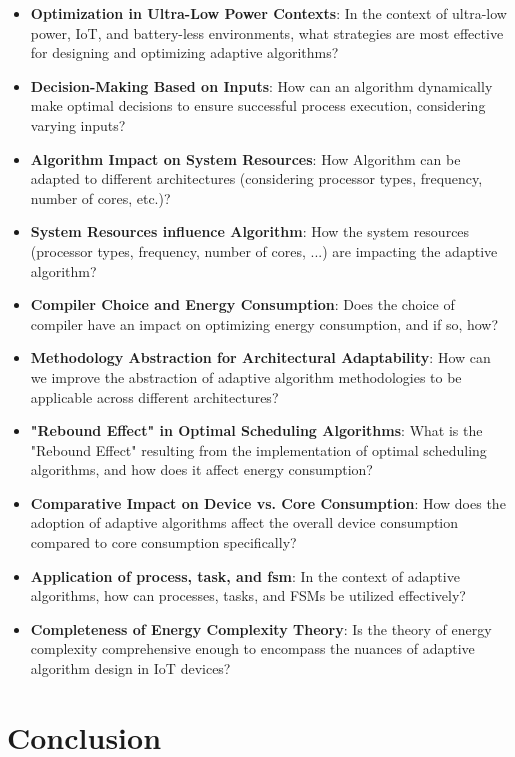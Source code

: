 \documentclass[12pt,a4paper]{article}
\begin{document}
        \begin{itemize}
            \item \textbf{Optimization in Ultra-Low Power Contexts}: In the context of ultra-low power, IoT, and battery-less environments, what strategies are most effective for designing and optimizing adaptive algorithms?
            \item \textbf{Decision-Making Based on Inputs}: How can an algorithm dynamically make optimal decisions to ensure successful process execution, considering varying inputs?
            \item \textbf{Algorithm Impact on System Resources}: How Algorithm can be adapted to different architectures (considering processor types, frequency, number of cores, etc.)?
            \item \textbf{System Resources influence Algorithm}: How the system resources (processor types, frequency, number of cores, ...) are impacting the adaptive algorithm?
            \item \textbf{Compiler Choice and Energy Consumption}: Does the choice of compiler have an impact on optimizing energy consumption, and if so, how?
            \item \textbf{Methodology Abstraction for Architectural Adaptability}: How can we improve the abstraction of adaptive algorithm methodologies to be applicable across different architectures?
            \item \textbf{"Rebound Effect" in Optimal Scheduling Algorithms}: What is the "Rebound Effect" resulting from the implementation of optimal scheduling algorithms, and how does it affect energy consumption?
            \item \textbf{Comparative Impact on Device vs. Core Consumption}: How does the adoption of adaptive algorithms affect the overall device consumption compared to core consumption specifically?
            \item \textbf{Application of \gls{process}, \gls{task}, and \gls{fsm}}: In the context of adaptive algorithms, how can processes, tasks, and FSMs be utilized effectively?
            \item \textbf{Completeness of Energy Complexity Theory}: Is the theory of energy complexity comprehensive enough to encompass the nuances of adaptive algorithm design in IoT devices?
        \end{itemize}



    \newpage
    \section{Conclusion}
\end{document}
